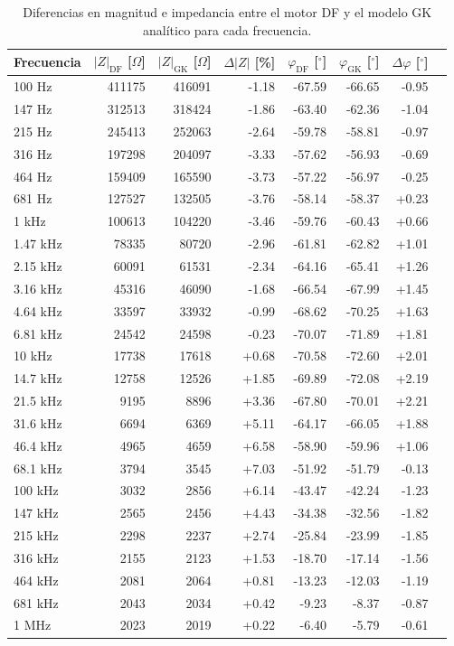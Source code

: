\begin{table}[ht]
\centering
\caption{Diferencias en magnitud e impedancia entre el motor DF y el modelo GK analítico para cada frecuencia.}
\label{tab:diff_ZPh}
\small
\begin{tabular}{lrrrrrrr}
\toprule
Frecuencia & $|Z|_{\mathrm{DF}}$ [$\Omega$] & $|Z|_{\mathrm{GK}}$ [$\Omega$] & $\Delta|Z|$ [\%] & $\varphi_{\mathrm{DF}}$ [$^\circ$] & $\varphi_{\mathrm{GK}}$ [$^\circ$] & $\Delta\varphi$ [$^\circ$] \\
\midrule
100 Hz     & 411175 & 416091 & -1.18 & -67.59 & -66.65 & -0.95 \\
147 Hz     & 312513 & 318424 & -1.86 & -63.40 & -62.36 & -1.04 \\
215 Hz     & 245413 & 252063 & -2.64 & -59.78 & -58.81 & -0.97 \\
316 Hz     & 197298 & 204097 & -3.33 & -57.62 & -56.93 & -0.69 \\
464 Hz     & 159409 & 165590 & -3.73 & -57.22 & -56.97 & -0.25 \\
681 Hz     & 127527 & 132505 & -3.76 & -58.14 & -58.37 & +0.23 \\
1 kHz      & 100613 & 104220 & -3.46 & -59.76 & -60.43 & +0.66 \\
1.47 kHz   & 78335 & 80720 & -2.96 & -61.81 & -62.82 & +1.01 \\
2.15 kHz   & 60091 & 61531 & -2.34 & -64.16 & -65.41 & +1.26 \\
3.16 kHz   & 45316 & 46090 & -1.68 & -66.54 & -67.99 & +1.45 \\
4.64 kHz   & 33597 & 33932 & -0.99 & -68.62 & -70.25 & +1.63 \\
6.81 kHz   & 24542 & 24598 & -0.23 & -70.07 & -71.89 & +1.81 \\
10 kHz     & 17738 & 17618 & +0.68 & -70.58 & -72.60 & +2.01 \\
14.7 kHz   & 12758 & 12526 & +1.85 & -69.89 & -72.08 & +2.19 \\
21.5 kHz   & 9195 & 8896 & +3.36 & -67.80 & -70.01 & +2.21 \\
31.6 kHz   & 6694 & 6369 & +5.11 & -64.17 & -66.05 & +1.88 \\
46.4 kHz   & 4965 & 4659 & +6.58 & -58.90 & -59.96 & +1.06 \\
68.1 kHz   & 3794 & 3545 & +7.03 & -51.92 & -51.79 & -0.13 \\
100 kHz    & 3032 & 2856 & +6.14 & -43.47 & -42.24 & -1.23 \\
147 kHz    & 2565 & 2456 & +4.43 & -34.38 & -32.56 & -1.82 \\
215 kHz    & 2298 & 2237 & +2.74 & -25.84 & -23.99 & -1.85 \\
316 kHz    & 2155 & 2123 & +1.53 & -18.70 & -17.14 & -1.56 \\
464 kHz    & 2081 & 2064 & +0.81 & -13.23 & -12.03 & -1.19 \\
681 kHz    & 2043 & 2034 & +0.42 & -9.23 & -8.37 & -0.87 \\
1 MHz      & 2023 & 2019 & +0.22 & -6.40 & -5.79 & -0.61 \\
\bottomrule
\end{tabular}
\end{table}
